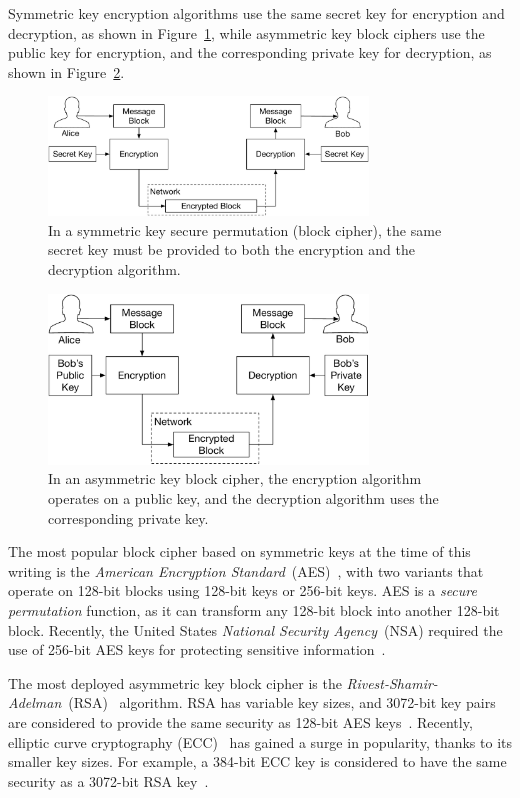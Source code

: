 Symmetric key encryption algorithms use the same secret key for encryption and
decryption, as shown in Figure~\ref{fig:symmetric_block_cipher}, while
asymmetric key block ciphers use the public key for encryption, and the
corresponding private key for decryption, as shown in
Figure~\ref{fig:asymmetric_block_cipher}.
\begin{figure}[hbt]
  \centering
  \includegraphics[width=85mm]{figures/symmetric_block_cipher.pdf}
  \caption{
    In a symmetric key secure permutation (block cipher), the same secret key
    must be provided to both the encryption and the decryption algorithm.
  }
  \label{fig:symmetric_block_cipher}
\end{figure}

\begin{figure}[hbt]
  \centering
  \includegraphics[width=85mm]{figures/asymmetric_block_cipher.pdf}
  \caption{
    In an asymmetric key block cipher, the encryption algorithm operates on a
    public key, and the decryption algorithm uses the corresponding private
    key.
  }
  \label{fig:asymmetric_block_cipher}
\end{figure}


The most popular block cipher based on symmetric keys at the time of this
writing is the
\textit{American Encryption Standard}~(AES)~\cite{daemen1999aes, fips2001aes},
with two variants that operate on 128-bit blocks using 128-bit keys or 256-bit
keys. AES is a \textit{secure permutation} function, as it can transform any
128-bit block into another 128-bit block. Recently, the United States
\textit{National Security Agency}~(NSA) required the use of 256-bit AES keys
for protecting sensitive information~\cite{nsa2015suiteb}.

The most deployed asymmetric key block cipher is the
\textit{Rivest-Shamir-Adelman}~(RSA)~\cite{rivest1978rsa} algorithm. RSA has
variable key sizes, and 3072-bit key pairs are considered to provide the same
security as 128-bit AES keys~\cite{fips2012keysize}. Recently, elliptic curve
cryptography (ECC)~\cite{koblitz1987ecc} has gained a surge in popularity,
thanks to its smaller key sizes. For example, a 384-bit ECC key is considered
to have the same security as a 3072-bit RSA
key~\cite{fips2012keysize, nsa2015suiteb}.

